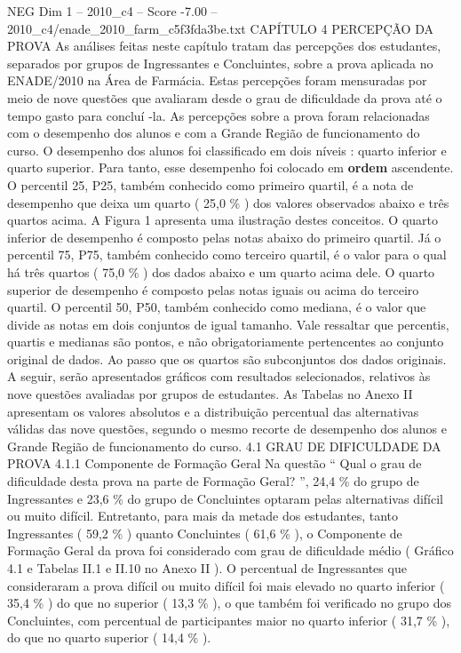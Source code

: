 \begin{textsample}{NEG Dim 1 – 2010\_c4 – Score -7.00 – 2010\_c4/enade\_2010\_farm\_c5f3fda3be.txt}  \label{ex:f1_neg_032}
CAPÍTULO 4 PERCEPÇÃO DA PROVA As análises feitas neste capítulo tratam das percepções dos estudantes, separados por grupos de Ingressantes e Concluintes, sobre a prova aplicada no ENADE/2010 na Área de Farmácia.
Estas percepções foram mensuradas por meio de nove questões que avaliaram desde o grau de dificuldade da prova até o tempo gasto para concluí -la.
As percepções sobre a prova foram relacionadas com o desempenho dos alunos e com a Grande Região de funcionamento do curso.
O desempenho dos alunos foi classificado em dois níveis : quarto inferior e quarto superior.
Para tanto, esse desempenho foi colocado em \textbf{ordem} ascendente.
O percentil 25, P25, também conhecido como primeiro quartil, é a nota de desempenho que deixa um quarto ( 25,0 \% ) dos valores observados abaixo e três quartos acima.
A Figura 1 apresenta uma ilustração destes conceitos.
O quarto inferior de desempenho é composto pelas notas abaixo do primeiro quartil.
Já o percentil 75, P75, também conhecido como terceiro quartil, é o valor para o qual há três quartos ( 75,0 \% ) dos dados abaixo e um quarto acima dele.
O quarto superior de desempenho é composto pelas notas iguais ou acima do terceiro quartil.
O percentil 50, P50, também conhecido como mediana, é o valor que divide as notas em dois conjuntos de igual tamanho.
Vale ressaltar que percentis, quartis e medianas são pontos, e não obrigatoriamente pertencentes ao conjunto original de dados.
Ao passo que os quartos são subconjuntos dos dados originais.
A seguir, serão apresentados gráficos com resultados selecionados, relativos às nove questões avaliadas por grupos de estudantes.
As Tabelas no Anexo II apresentam os valores absolutos e a distribuição percentual das alternativas válidas das nove questões, segundo o mesmo recorte de desempenho dos alunos e Grande Região de funcionamento do curso. 4.1 GRAU DE DIFICULDADE DA PROVA 4.1.1 Componente de Formação Geral Na questão “ Qual o grau de dificuldade desta prova na parte de Formação Geral? ”, 24,4 \% do grupo de Ingressantes e 23,6 \% do grupo de Concluintes optaram pelas alternativas difícil ou muito difícil.
Entretanto, para mais da metade dos estudantes, tanto Ingressantes ( 59,2 \% ) quanto Concluintes ( 61,6 \% ), o Componente de Formação Geral da prova foi considerado com grau de dificuldade médio ( Gráfico 4.1 e Tabelas II.1 e II.10 no Anexo II ).
O percentual de Ingressantes que consideraram a prova difícil ou muito difícil foi mais elevado no quarto inferior ( 35,4 \% ) do que no superior ( 13,3 \% ), o que também foi verificado no grupo dos Concluintes, com percentual de participantes maior no quarto inferior ( 31,7 \% ), do que no quarto superior ( 14,4 \% ).

\end{textsample}
